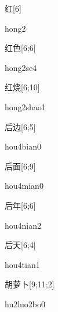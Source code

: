\begin{verbete}[hong2]{红}[6]
\begin{pronuncia}{hong2}
\end{pronuncia}
\end{verbete}

\begin{verbete}[hong2se4]{红色}[6;6]
\begin{pronuncia}{hong2se4}
\end{pronuncia}
\end{verbete}

\begin{verbete}{红烧}[6;10]
\begin{pronuncia}{hong2shao1}
\end{pronuncia}
\end{verbete}

\begin{verbete}{后边}[6;5]
\begin{pronuncia}{hou4bian0}
\end{pronuncia}
\end{verbete}

\begin{verbete}{后面}[6;9]
\begin{pronuncia}{hou4mian0}
\end{pronuncia}
\end{verbete}

\begin{verbete}{后年}[6;6]
\begin{pronuncia}{hou4nian2}
\end{pronuncia}
\end{verbete}

\begin{verbete}{后天}[6;4]
\begin{pronuncia}{hou4tian1}
\end{pronuncia}
\end{verbete}

\begin{verbete}[hu2luo2bo0]{胡萝卜}[9;11;2]
\begin{pronuncia}{hu2luo2bo0}
\end{pronuncia}
\end{verbete}

